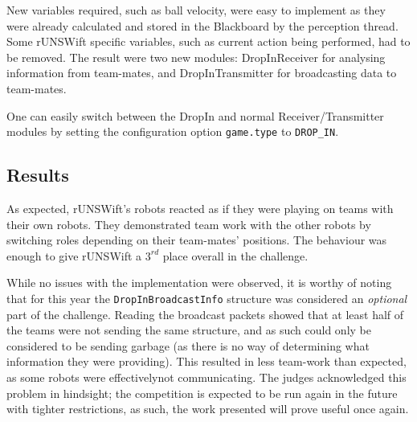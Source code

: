 New variables required, such as ball velocity, were easy to implement as they were already calculated and stored in the Blackboard by the perception thread. Some rUNSWift specific variables, such as current action being performed, had to be removed. The result were two new modules: DropInReceiver for analysing information from team-mates, and DropInTransmitter for broadcasting data to team-mates.

One can easily switch between the DropIn and normal Receiver/Transmitter modules by setting the configuration option \texttt{game.type} to \texttt{DROP\_IN}.

\subsection{Results}

As expected, rUNSWift's robots reacted as if they were playing on teams with their own robots. They demonstrated team work with the other robots by switching roles depending on their team-mates' positions. The behaviour was enough to give rUNSWift a $3^{rd}$ place overall in the challenge.

While no issues with the implementation were observed, it is worthy of noting that for this year the \texttt{DropInBroadcastInfo} structure was considered an \textit{optional} part of the challenge. Reading the broadcast packets showed that at least half of the teams were not sending the same structure, and as such could only be considered to be sending garbage (as there is no way of determining what information they were providing). This resulted in less team-work than expected, as some robots were effectivelynot communicating. The judges acknowledged this problem in hindsight; the competition is expected to be run again in the future with tighter restrictions, as such, the work presented will prove useful once again.

